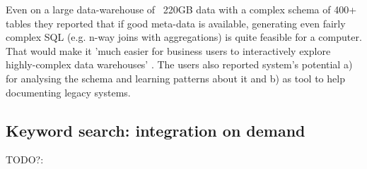 Even on a large data-warehouse of ~220GB data with a complex schema of 400+ tables they reported that if good meta-data is available, generating even fairly complex SQL  (e.g. n-way joins with aggregations) is quite feasible for a computer. That would make it 'much easier for business users to interactively explore highly-complex data warehouses' \cite[p.932]{ethz2012}. The users also reported system's potential a) for analysing the schema and learning patterns about it and b) as tool to help documenting legacy systems.


\subsection{Keyword search: integration on demand}
{\color{red}TODO?: \cite[ch.16]{principles_data_integration}}















